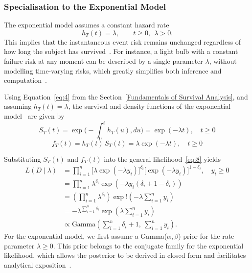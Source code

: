 \subsubsection{Specialisation to the Exponential Model}
The exponential model assumes a constant hazard rate
\begin{equation}
h_T(t)=\lambda,\qquad t\ge 0,\ \ \lambda>0 .
\end{equation}
This implies that the instantaneous event risk remains unchanged regardless of how long the subject has survived~\cite{lawless2011statistical, ibrahim2013bayesian}. For instance, a light bulb with a constant failure risk at any moment can be described by a single parameter $\lambda$, without modelling time-varying risks, which greatly simplifies both inference and computation~\cite{lawless2011statistical}.

Using Equation~\eqref{eq:4} from the Section~\ref{Fundamentals of Survival Analysis}, and assuming $h_T(t) = \lambda$, the survival and density functions of the exponential model~\cite{kleinbaum1996survival} are given by
\begin{equation}
    S_T(t) = \exp\Big( -\displaystyle\int_0^t h_T(u), du \Big)=\exp(-\lambda t), \quad t \ge 0
    \label{St_exp}
\end{equation}
\begin{equation}
    f_T(t) = h_T(t)\, S_T(t)=\lambda \exp(-\lambda t), \quad t \ge 0
    \label{ft_exp}
\end{equation}

Substituting $S_T(t)$ and $f_T(t)$ into the general likelihood~\eqref{eq:8} yields~\cite{ibrahim2013bayesian}
\begin{align}
L(D \mid \lambda)
&=\prod_{i=1}^{n}
\big[\lambda \exp(-\lambda y_i)\big]^{\delta_i}
\big[\exp(-\lambda y_i)\big]^{1-\delta_i}, \quad y_i \ge 0 \\
&=
\prod_{i=1}^{n}
\lambda^{\delta_i}
\exp\left(
-\lambda y_i (\delta_i + 1 - \delta_i)
\right) \\
&=
\left(
\prod_{i=1}^{n}
\lambda^{\delta_i}
\right)
\exp!\left(
-\lambda \sum_{i=1}^{n} y_i
\right)\\
&=
-\lambda^{\sum_{i=1}^{n} \delta_i}
\exp\left(
\lambda \sum_{i=1}^{n} y_i
\right)\\
&\propto
\text{Gamma}
\left(
\sum_{i=1}^{n} \delta_i + 1,\ \sum_{i=1}^{n} y_i
\right).
\end{align}
For the exponential model, we first assume a Gamma($\alpha, \beta$) prior for the rate parameter $\lambda \ge 0$. This prior belongs to the conjugate family for the exponential likelihood, which allows the posterior to be derived in closed form and facilitates analytical exposition~\cite{kalbfleisch2002statistical}.

